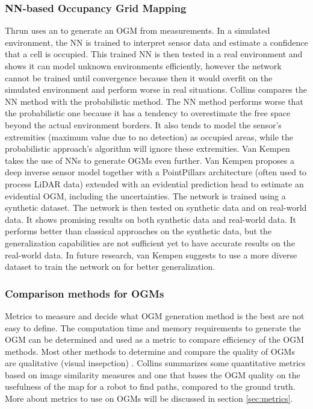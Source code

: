 \subsubsection{\gls{NN}-based Occupancy Grid Mapping}
Thrun \cite{thrun1993exploration} uses an  to generate an \gls{OGM} from measurements. In a simulated environment, the \gls{NN} is trained to interpret sensor data and estimate a confidence that a cell is occupied. This trained \gls{NN} is then tested in a real environment and shows it can model unknown environments efficiently, however the network cannot be trained until convergence because then it would overfit on the simulated environment and perform worse in real situations. Collins \cite{collins2007occupancy} compares the \gls{NN} method with the probabilistic method. The \gls{NN} method performs worse that the probabilistic one because it has a tendency to overestimate the free space beyond the actual environment borders. It also tends to model the sensor's extremities (maximum value due to no detection) as occupied areas, while the probabilistic approach's algorithm will ignore these extremities. Van Kempen \cite{van2021simulation} takes the use of \glspl{NN} to generate OGMs even further. Van Kempen proposes a deep inverse sensor model together with a PointPillars architecture (often used to process LiDAR data) extended with an evidential prediction head to estimate an evidential \gls{OGM}, including the uncertainties. The network is trained using a synthetic dataset. The network is then tested on synthetic data and on real-world data. It shows promising results on both synthetic data and real-world data. It performs better than classical approaches on the synthetic data, but the generalization capabilities are not sufficient yet to have accurate results on the real-world data. In future research, van Kempen suggests to use a more diverse dataset to train the network on for better generalization. 

\subsubsection{Comparison methods for \glspl{OGM}}
Metrics to measure and decide what \gls{OGM} generation method is the best are not easy to define. The computation time and memory requirements to generate the \gls{OGM} can be determined and used as a metric to compare efficiency of the \gls{OGM} methods. Most other methods to determine and compare the quality of \glspl{OGM} are qualitative (visual insepction) \cite{ribo2001comparison}. Collins \cite{collins2007occupancy} summarizes some quantitative metrics based on image similarity measures and one that bases the \gls{OGM} quality on the usefulness of the map for a robot to find paths, compared to the ground truth. More about metrics to use on OGMs will be discussed in section \ref{sec:metrics}. \\

